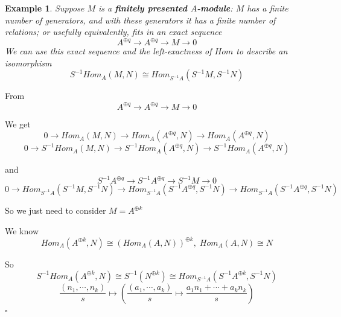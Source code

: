 \documentclass{article}
\newtheorem{example}[theorem]{Example}
\newenvironment{Proof}{{\noindent \indent \it Proof:\quad}}{\hfill $\square$\par}
\begin{document}
\begin{example}\label{example 1.75}
Suppose $M$ is a \textbf{finitely presented $A$-module}: $M$ has a finite
number of generators, and with these generators it has a finite number of relations;
or usefully equivalently, fits in an exact sequence
\begin{equation*}
    A^{\oplus q}
    \rightarrow A^{\oplus q}
    \rightarrow M
    \rightarrow 0
\end{equation*}
We can use this exact sequence and the left-exactness of $Hom$ to describe an isomorphism
\begin{equation*}
S^{-1} Hom_A(M, N) \cong Hom_{S^{-1}A}(S^{-1}M, S^{-1}N)
\end{equation*}
\end{example}
\begin{Proof}
From 
\begin{equation*}
    A^{\oplus q}\rightarrow A^{\oplus q}\rightarrow M
    \rightarrow 0
\end{equation*}

We get 
\begin{equation*}    
0
\rightarrow
Hom_A(M,N)
\rightarrow 
Hom_A(A^{\oplus q},N)
\rightarrow 
Hom_A(A^{\oplus q},N)
\end{equation*}
\begin{equation*}    
0
\rightarrow
S^{-1}Hom_A(M,N)
\rightarrow 
S^{-1}Hom_A(A^{\oplus q},N)
\rightarrow 
S^{-1}Hom_A(A^{\oplus q},N)
\end{equation*}

and
\begin{equation*}    S^{-1}A^{\oplus q}
\rightarrow S^{-1}A^{\oplus q}
\rightarrow 
S^{-1}M
\rightarrow
0
\end{equation*}
\begin{equation*}    
0
\rightarrow
Hom_{S^{-1}A}(S^{-1}M,S^{-1}N)
\rightarrow 
Hom_{S^{-1}A}(S^{-1}A^{\oplus q},S^{-1}N)
\rightarrow
Hom_{S^{-1}A}(S^{-1}A^{\oplus q},S^{-1}N)
\end{equation*}

So we just need to consider $M=A^{\oplus k}$

We know 
\begin{equation*}
  Hom_A(A^{\oplus k},N)\cong (Hom_A(A,N))^{\oplus k},\;Hom_A(A,N)\cong N
\end{equation*}

So
\begin{equation*} S^{-1}Hom_A(A^{\oplus k},N)
\cong
S^{-1}(N^{\oplus k})
\cong
Hom_{S^{-1}A}(S^{-1}A^{\oplus k}, S^{-1}N)
\end{equation*}
\begin{equation*}
\frac{(n_1,\cdots,n_k)}{s}
\mapsto
(\frac{(a_1,\cdots,a_k)}{s}
\mapsto
\frac{a_1n_1+\cdots+a_kn_k}{s})
\end{equation*}
\end{Proof}
\end{document}
